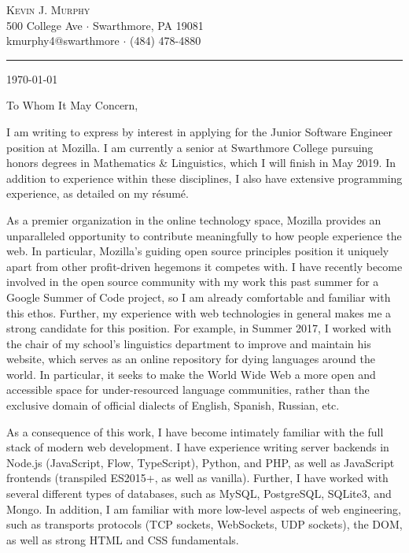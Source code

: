 \documentclass[paper=a4, fontsize=12pt]{scrartcl} %
\begin{document}
\begin{flushright}
  { \Large
    \textsc{Kevin J. Murphy}\\
    \vspace{0.3em}
  }
  {
    \footnotesize
    500 College Ave $\cdot$ Swarthmore, PA 19081\\
    kmurphy4@swarthmore $\cdot$ (484) 478-4880\\
  }
\end{flushright}
\vspace{-2em}
\rule{\linewidth}{0.3pt}

\today

To Whom It May Concern,

I am writing to express by interest in applying for the Junior Software Engineer position at Mozilla.  I am currently a senior at Swarthmore College pursuing honors degrees in Mathematics \& Linguistics, which I will finish in May 2019.  In addition to experience within these disciplines, I also have extensive programming experience, as detailed on my r\'esum\'e.

As a premier organization in the online technology space, Mozilla provides an unparalleled opportunity to contribute meaningfully to how people experience the web.  In particular, Mozilla's guiding open source principles position it uniquely apart from other profit-driven hegemons it competes with.  I have recently become involved in the open source community with my work this past summer for a Google Summer of Code project, so I am already comfortable and familiar with this ethos.  Further, my experience with web technologies in general makes me a strong candidate for this position.  For example, in Summer 2017, I worked with the chair of my school's linguistics department to improve and maintain his website, which serves as an online repository for dying languages around the world.  In particular, it seeks to make the World Wide Web a more open and accessible space for under-resourced language communities, rather than the exclusive domain of official dialects of English, Spanish, Russian, etc.

As a consequence of this work, I have become intimately familiar with the full stack of modern web development.  I have experience writing server backends in Node.js (JavaScript, Flow, TypeScript), Python, and PHP, as well as JavaScript frontends (transpiled ES2015+, as well as vanilla).  Further, I have worked with several different types of databases, such as MySQL, PostgreSQL, SQLite3, and Mongo.  In addition, I am familiar with more low-level aspects of web engineering, such as transports protocols (TCP sockets, WebSockets, UDP sockets), the DOM, as well as strong HTML and CSS fundamentals.
\end{document}
